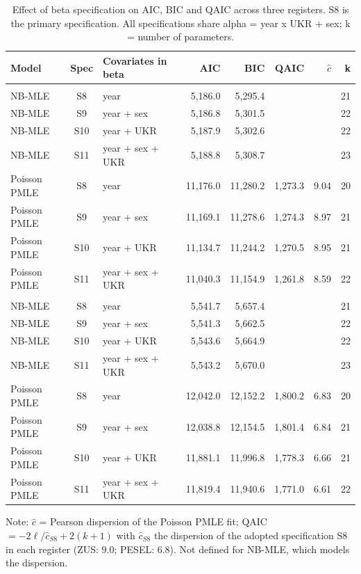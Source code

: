 \begin{table}[ht!]
\caption{\label{tbl-beta-comparison}Effect of beta specification on AIC, BIC and QAIC across three registers. S8 is the primary specification. All specifications share alpha = year x UKR + sex; k = number of parameters.} 
\fontsize{8.0pt}{10.0pt}\selectfont
\begin{tabular*}{\linewidth}{@{\extracolsep{\fill}}lclrrrrr}
\toprule
Model & Spec & Covariates in beta & AIC & BIC & QAIC & $\hat c$ & k \\ 
\midrule\addlinespace[2.5pt]
\multicolumn{8}{l}{ZUS} \\[2.5pt] 
\midrule\addlinespace[2.5pt]
NB-MLE & S8 & year & 5,186.0 & 5,295.4 &  &  & 21 \\ 
NB-MLE & S9 & year + sex & 5,186.8 & 5,301.5 &  &  & 22 \\ 
NB-MLE & S10 & year + UKR & 5,187.9 & 5,302.6 &  &  & 22 \\ 
NB-MLE & S11 & year + sex + UKR & 5,188.8 & 5,308.7 &  &  & 23 \\ 
Poisson PMLE & S8 & year & 11,176.0 & 11,280.2 & 1,273.3 & 9.04 & 20 \\ 
Poisson PMLE & S9 & year + sex & 11,169.1 & 11,278.6 & 1,274.3 & 8.97 & 21 \\ 
Poisson PMLE & S10 & year + UKR & 11,134.7 & 11,244.2 & 1,270.5 & 8.95 & 21 \\ 
Poisson PMLE & S11 & year + sex + UKR & 11,040.3 & 11,154.9 & 1,261.8 & 8.59 & 22 \\ 
\midrule\addlinespace[2.5pt]
\multicolumn{8}{l}{PESEL} \\[2.5pt] 
\midrule\addlinespace[2.5pt]
NB-MLE & S8 & year & 5,541.7 & 5,657.4 &  &  & 21 \\ 
NB-MLE & S9 & year + sex & 5,541.3 & 5,662.5 &  &  & 22 \\ 
NB-MLE & S10 & year + UKR & 5,543.6 & 5,664.9 &  &  & 22 \\ 
NB-MLE & S11 & year + sex + UKR & 5,543.2 & 5,670.0 &  &  & 23 \\ 
Poisson PMLE & S8 & year & 12,042.0 & 12,152.2 & 1,800.2 & 6.83 & 20 \\ 
Poisson PMLE & S9 & year + sex & 12,038.8 & 12,154.5 & 1,801.4 & 6.84 & 21 \\ 
Poisson PMLE & S10 & year + UKR & 11,881.1 & 11,996.8 & 1,778.3 & 6.66 & 21 \\ 
Poisson PMLE & S11 & year + sex + UKR & 11,819.4 & 11,940.6 & 1,771.0 & 6.61 & 22 \\ 
\bottomrule
\end{tabular*}
\begin{minipage}{\linewidth}
\vspace{.05em}
Note: $\hat c$ = Pearson dispersion of the Poisson PMLE fit; QAIC $= -2\ell/\hat c_{S8} + 2(k+1)$ with $\hat c_{S8}$ the dispersion of the adopted specification S8 in each register (ZUS: 9.0; PESEL: 6.8). Not defined for NB-MLE, which models the dispersion.\\
\end{minipage}
\end{table}

